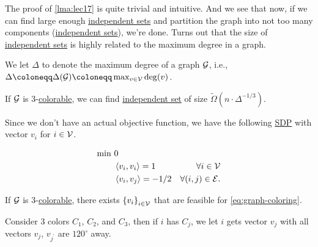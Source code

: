 The proof of \autoref{lma:lec17} is quite trivial and intuitive. And we see that now, if we can find large enough \hyperref[def:independent-set]{independent sets} and partition the graph into not too many components (\hyperref[def:independent-set]{independent sets}), we're done. Turns out that the size of \hyperref[def:independent-set]{independent sets} is highly related to the maximum degree in a graph.

\begin{notation}
	We let \(\Delta \) to denote the maximum degree of a graph \(\mathcal{\MakeUppercase{g}} \), i.e., \(\Delta \coloneqq \Delta (\mathcal{\MakeUppercase{G}} )\coloneqq \max_{v\in \mathcal{\MakeUppercase{v}} } \deg(v)\).
\end{notation}

\begin{theorem}
	If \(\mathcal{\MakeUppercase{g}} \) is \(3\)-\hyperref[def:coloring]{colorable}, we can find \hyperref[def:independent-set]{independent set} of size \(\widetilde{\Omega} (n\cdot \Delta ^{-1 / 3})\).
\end{theorem}

Since we don't have an actual objective function, we have the following \hyperref[def:SDP]{SDP} with vector \(v_i\) for \(i\in \mathcal{\MakeUppercase{v}} \).

\begin{equation}\label{eq:graph-coloring}
	\begin{aligned}
		\min~ & 0                                                                                             \\
		      & \left\langle v_i, v_i \right\rangle = 1      & \forall i\in \mathcal{\MakeUppercase{v}}       \\
		      & \left\langle v_i, v_j \right\rangle = -1 / 2 & \forall (i, j)\in \mathcal{\MakeUppercase{e}}.
	\end{aligned}
\end{equation}
\begin{claim}
	If \(\mathcal{\MakeUppercase{g}} \) is \(3\)-\hyperref[def:coloring]{colorable}, there exists \(\left\{ v_i \right\}_{i\in \mathcal{\MakeUppercase{v}} } \) that are feasible for \autoref{eq:graph-coloring}.
\end{claim}
\begin{explanation}
	Consider \(3\) colors \(C_1\), \(C_2\), and \(C_3\), then if \(i\) has \(C_j\), we let \(i\) gets vector \(v_j\) with all vectors \(v_j\), \(v_{j^\prime }\) are \(120^{\circ } \) away.
	\begin{center}
	\end{center}
\end{explanation}

